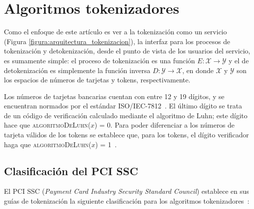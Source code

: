 %
%

\section{Algoritmos tokenizadores}
\label{sec:algoritmos}

Como el enfoque de este artículo es ver a la tokenización como un servicio
(Figura \ref{figura:arquitectura_tokenizacion}), la interfaz para los procesos
de tokenización y detokenización, desde el punto de vista de los usuarios del
servicio, es sumamente simple: el proceso de tokenización es una función $ E:
\mathcal{X} \rightarrow \mathcal{Y} $ y el de detokenización es  simplemente la
función inversa $ D: \mathcal{Y} \rightarrow \mathcal{X} $, en donde $
\mathcal{X} $ y $ \mathcal{Y} $ son los espacios de números de tarjetas y
tokens, respectivamente.

Los números de tarjetas bancarias cuentan con entre 12 y 19 dígitos, y se
encuentran normados por el estándar ISO/IEC-7812~\cite{iso_7812}. El último
dígito se trata de un código de verificación calculado mediante el algoritmo de
Luhn; este dígito hace que \textsc{algoritmoDeLuhn($ x $) = 0}. Para poder
diferenciar a los números de tarjeta válidos de los tokens se establece que,
para los tokens, el dígito verificador haga que
\textsc{algoritmoDeLuhn($ x $) = 1}~\cite{doc_sandra}.


\subsection{Clasificación del PCI SSC}

El PCI SSC (\textit{Payment Card Industry Security Standard Council}) establece
en sus guías de tokenización la siguiente clasificación para los algoritmos
tokenizadores~\cite{pci_tokens}:

